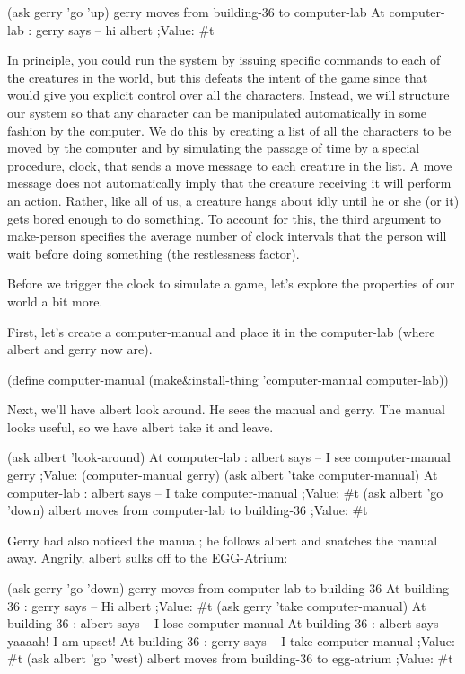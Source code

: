 \beginlisp
(ask gerry 'go 'up)
gerry moves from building-36 to computer-lab 
At computer-lab : gerry says -- hi albert 
;Value: \#t
\endlisp

In principle, you could run the system by issuing specific commands to
each of the creatures in the world, but this defeats the intent of the
game since that would give you explicit control over all the
characters.  Instead, we will structure our system so that any
character can be manipulated automatically in some fashion by the
computer.  We do this by creating a list of all the characters to be
moved by the computer and by simulating the passage of time by a
special procedure, {\cf clock}, that sends a {\cf move} message to
each creature in the list.  A {\cf move} message does not
automatically imply that the creature receiving it will perform an
action.  Rather, like all of us, a creature hangs about idly until he
or she (or it) gets bored enough to do something.  To account for
this, the third argument to {\cf make-person} specifies the average number of
clock intervals that the person will wait before doing something (the
restlessness factor).

Before we trigger the clock to simulate a game, let's explore the
properties of our world a bit more.

First, let's create a {\cf computer-manual} and place it in the {\cf
computer-lab} (where {\cf albert} and {\cf gerry} now are).

\beginlisp
(define computer-manual (make\&install-thing 'computer-manual computer-lab))
\endlisp

Next, we'll have {\cf albert} look around.  He sees the manual and {\cf
gerry}.  The manual looks useful, so we have {\cf albert} take it and leave.

\beginlisp
(ask albert 'look-around)
At computer-lab : albert says -- I see computer-manual gerry 
;Value: (computer-manual gerry)
\null
(ask albert 'take computer-manual)
At computer-lab : albert says -- I take computer-manual 
;Value: \#t
\null
(ask albert 'go 'down)
albert moves from computer-lab to building-36 
;Value: \#t
\endlisp

{\cf Gerry} had also noticed the manual; he follows {\cf albert} and
snatches the manual away.  Angrily, {\cf albert} sulks off to the
EGG-Atrium:

\beginlisp
(ask gerry 'go 'down)
gerry moves from computer-lab to building-36 
At building-36 : gerry says -- Hi albert 
;Value: \#t
\null
(ask gerry 'take computer-manual)
At building-36 : albert says -- I lose computer-manual 
At building-36 : albert says -- yaaaah! I am upset! 
At building-36 : gerry says -- I take computer-manual 
;Value: \#t
\null
(ask albert 'go 'west)
albert moves from building-36 to egg-atrium
;Value: \#t
\endlisp
 
